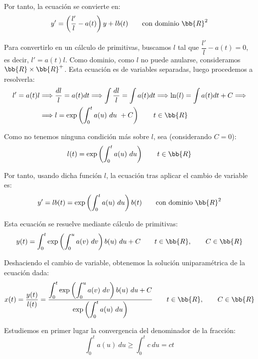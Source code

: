 \begin{ejercicio}
    Por tanto, la ecuación se convierte en:
    \begin{equation*}
        y' = \left(\dfrac{l'}{l} -a(t)\right)y + lb(t)\qquad \text{con dominio }\bb{R}^2
    \end{equation*}

    Para convertirlo en un cálculo de primitivas, buscamos $l$ tal que $\dfrac{l'}{l} -a(t) = 0$, es decir, $l' = a(t)l$. Como dominio, como $l$ no puede anularse, consideramos $\bb{R}\times \bb{R}^+$.
    Esta ecuación es de variables separadas, luego procedemos a resolverla:
    \begin{align*}
        l'=a(t)l &\Longrightarrow \dfrac{dl}{l} = a(t)dt \Longrightarrow \int \dfrac{dl}{l} = \int a(t)dt \Longrightarrow \ln(l) = \int a(t)dt + C \Longrightarrow\\&\Longrightarrow l =  \exp\left(\int_0^t a(u)~du~+C\right)  \qquad t\in \bb{R}
    \end{align*}

    Como no tenemos ninguna condición más sobre $l$, sea (considerando $C=0$):
    \begin{equation*}
        l(t) =  \exp\left(\int_0^t a(u)~du\right)  \qquad t\in \bb{R}
    \end{equation*}

    Por tanto, usando dicha función $l$, la ecuación tras aplicar el cambio de variable es:
    \begin{equation*}
        y' = lb(t) = \exp\left(\int_0^t a(u)~du\right)b(t) \qquad \text{con dominio }\bb{R}^2
    \end{equation*}

    Esta ecuación se resuelve mediante cálculo de primitivas:
    \begin{equation*}
        y(t) = \int_0^t \exp\left(\int_0^u a(v)~dv\right)b(u)~du + C \qquad t\in \bb{R}, \qquad C\in \bb{R}
    \end{equation*}

    Deshaciendo el cambio de variable, obtenemos la solución uniparamétrica de la ecuación dada:
    \begin{equation*}
        x(t) = \dfrac{y(t)}{l(t)} = \dfrac{\displaystyle\int_0^t \exp\left(\int_0^u a(v)~dv\right)b(u)~du + C}{\displaystyle \exp\left(\int_0^t a(u)~du\right)} \qquad t\in \bb{R}, \qquad C\in \bb{R}
    \end{equation*}

    Estudiemos en primer lugar la convergencia del denominador de la fracción:
    \begin{equation*}
        \int_0^t a(u)~du \geq \int_0^t c~du = ct
    \end{equation*}


\end{ejercicio}

